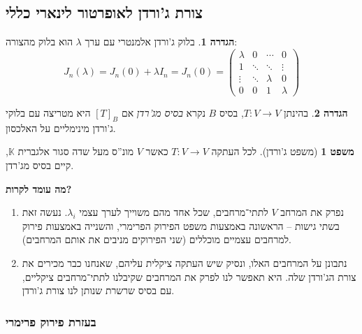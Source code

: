 \documentclass[a4paper]{article}
\newcommand\K     {\mathbb{K}}
\newcommand\co        {\colon}
\newcommand\pms[1]    {\begin{pmatrix}
		#1
\end{pmatrix}}
\renewcommand\lg      {\lambda}
\theoremstyle{definition}
\newtheorem{Theorem}{\color{myblue}משפט}
\newtheorem{Definition}{\color{mygreen}הגדרה}
\newcommand\defi  [1] {\begin{Definition}#1\end{Definition}}
\begin{document}
	\subsection{צורת ג'ורדן לאופרטור לינארי כללי}
	
	\defi{בלוק ג'ורדן אלמנטרי עם ערך $\lg$ הוא בלוק מהצורה: 
		\[ J_n(\lg) = J_n(0) + \lg I_n = J_n(0) = \pms{\lg & 0 & \cdots & 0 \\ 1 & \ddots & \ddots & \vdots \\ \vdots & \ddots & \lg & 0 \\ 0 & 0 & 1 & \lg} \]
	}
	\defi{בהינתן $T \co V \to V$, בסיס $B$ נקרא \textit{בסיס מג'רדן} אם $[T]_B$ היא מטריצה עם בלוקי ג'ורדן מינימליים על האלכסון. }
	
	
	\begin{Theorem}[משפט ג'ורדן]
		לכל העתקה $T \co V \to V$ כאשר $V$ מונ''ס מעל שדה סגור אלגברית $\K$, קיים בסיס מג'רדן. 
	\end{Theorem}
	
	\textbf{מה עומד לקרות? }
	\begin{enumerate}
		\item נפרק את המרחב $V$ לתתי־מרחבים, שכל אחד מהם משוייך לערך עצמי $\lg_i$. נעשה זאת בשתי גישות – הראשונה באמצעות משפט הפירוק הפרימרי, והשנייה באמצעות פירוק למרחבים עצמיים מוכללים (שני הפירוקים מניבים את אותם המרחבים). 
		\item נתבונן על המרחבים האלו, ונסיק שיש העתקה ציקלית עליהם, שאנחנו כבר מכירים את צורת הג'ורדן שלה. היא תאפשר לנו לפרק את המרחבים שקיבלנו לתתי־מרחבים ציקליים, עם בסיס שרשרת שנותן לנו צורת ג'ורדן. 
	\end{enumerate}
	
	\subsubsection{בעזרת פירוק פרימרי}
	
\end{document}
